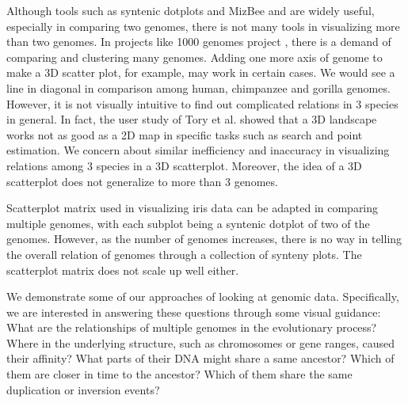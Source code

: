 \documentclass{vgtc}                      %
\begin{document}
Although tools such as syntenic dotplots and MizBee \cite{meyer2009mizbee} and are widely useful, especially in comparing two genomes, there is not many tools in visualizing more than two genomes. In projects like 1000 genomes project \cite{1000genomes}, there is a demand of comparing and clustering many genomes. Adding one more axis of genome to make a 3D scatter plot, for example, may work in certain cases. We would see a line in  diagonal in comparison among human, chimpanzee and gorilla genomes\cite{synmap3durl}. However, it is not visually intuitive to find out complicated relations in 3 species in general. 
In fact, the user study of Tory et al. \cite{tory2007spatialization} showed that a 3D landscape works not as good as a 2D map in specific tasks such as search and point estimation. We concern about similar inefficiency and inaccuracy in visualizing relations among 3 species in a 3D scatterplot. Moreover, the idea of a 3D scatterplot does not generalize to more than 3 genomes.

Scatterplot matrix used in visualizing iris data can be adapted in comparing multiple genomes, with each subplot being a syntenic dotplot of two of the genomes. However, as the number of genomes increases, there is no way in telling the overall relation of genomes through a collection of synteny plots. The scatterplot matrix does not scale up well either.

We demonstrate some of our approaches of looking at genomic data. Specifically, we are interested in answering these questions through some visual guidance: What are the relationships of multiple genomes in the evolutionary process? Where in the underlying structure, such as chromosomes or gene ranges, caused their affinity? What parts of their DNA might share a same ancestor? Which of them are closer in time to the ancestor? Which of them share the same duplication or inversion events?

\end{document}
